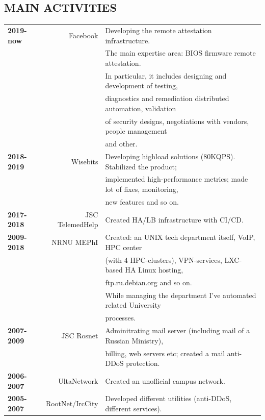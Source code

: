 \begin{resume}
\section{MAIN ACTIVITIES}
\vspace{0.1in} 
\begin{tabular}{lrl}
    {\bf 2019-now}  & Facebook        & Developing the remote attestation infrastructure.\\
                    &                 & The main expertise area: BIOS firmware remote attestation.\\
                    &                 & In particular, it includes designing and development of testing,\\
                    &                 & diagnostics and remediation distributed automation, validation\\
                    &                 & of security designs, negotiations with vendors, people management\\
                    &                 & and other.\\
    {\bf 2018-2019} & Wisebits        & Developing highload solutions (80KQPS). Stabilized the product;\\
                    &                 & implemented high-performance metrics; made lot of fixes, monitoring,\\
                    &                 & new features and so on.\\
    {\bf 2017-2018} & JSC TelemedHelp & Created HA/LB infrastructure with CI/CD.\\
    {\bf 2009-2018} & NRNU MEPhI      & Created: an UNIX tech department itself, VoIP, HPC center\\
                    &                 & (with 4 HPC-clusters), VPN-services, LXC-based HA Linux hosting,\\
                    &                 & ftp.ru.debian.org and so on.\\
                    &                 & While managing the department I've automated related University\\
                    &                 & processes.\\
    {\bf 2007-2009} & JSC Rosnet      & Adminitrating mail server (including mail of a Russian Ministry),\\
                    &                 & billing, web servers etc; created a mail anti-DDoS protection.\\
    {\bf 2006-2007} & UltaNetwork     & Created an unofficial campus network.\\
    {\bf 2005-2007} & RootNet/IrcCity & Developed different utilities (anti-DDoS, different services).\\
\end{tabular}
\end{resume}
